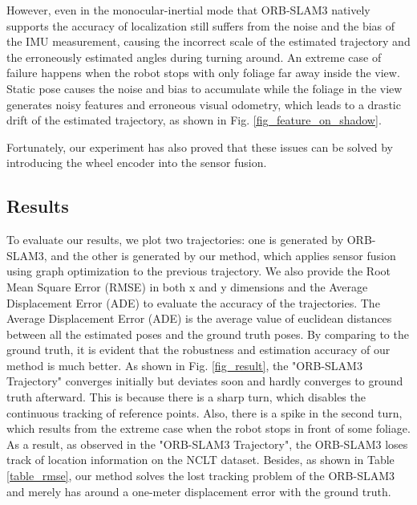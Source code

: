\documentclass[letterpaper, 10 pt, conference]{ieeeconf}  %
\begin{document}
However, even in the monocular-inertial mode that ORB-SLAM3 natively supports the accuracy of localization still suffers from the noise and the bias of the IMU measurement, causing the incorrect scale of the estimated trajectory and the erroneously estimated angles during turning around. An extreme case of failure happens when the robot stops with only foliage far away inside the view. Static pose causes the noise and bias to accumulate while the foliage in the view generates noisy features and erroneous visual odometry, which leads to a drastic drift of the estimated trajectory, as shown in Fig. \ref{fig_feature_on_shadow}.


Fortunately, our experiment has also proved that these issues can be solved by introducing the wheel encoder into the sensor fusion.


\subsection{Results}
To evaluate our results, we plot two trajectories: one is generated by ORB-SLAM3, and the other is generated by our method, which applies sensor fusion using graph optimization to the previous trajectory. We also provide the Root Mean Square Error (RMSE) in both x and y dimensions and the Average Displacement Error (ADE) to evaluate the accuracy of the trajectories. The Average Displacement Error (ADE) is the average value of euclidean distances between all the estimated poses and the ground truth poses.
By comparing to the ground truth, it is evident that the robustness and estimation accuracy of our method is much better. As shown in Fig. \ref{fig_result}, the "ORB-SLAM3 Trajectory" converges initially but deviates soon and hardly converges to ground truth afterward. This is because there is a sharp turn, which disables the continuous tracking of reference points. Also, there is a spike in the second turn, which results from the extreme case when the robot stops in front of some foliage. As a result, as observed in the "ORB-SLAM3 Trajectory", the ORB-SLAM3 loses track of location information on the NCLT dataset. Besides, as shown in Table \ref{table_rmse}, our method solves the lost tracking problem of the ORB-SLAM3 and merely has around a one-meter displacement error with the ground truth.
\end{document}
